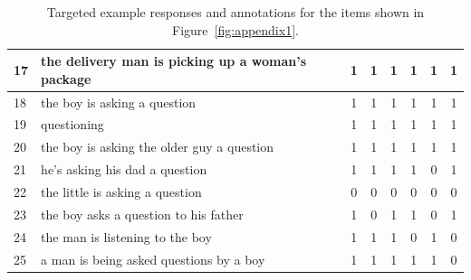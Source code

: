 \documentclass[12pt,notitlepage]{article}
\begin{document}
\begin{table}[h]
\begin{center}
\begin{tabular}{|l|p{11cm}|c|c|c|c|c|c|}
\hline
17 & the delivery man is picking up a woman's package & 1 & 1 & 1 & 1 & 1 & 1 \\
\hline
\hline
18 & the boy is asking a question & 1 & 1 & 1 & 1 & 1 & 1 \\
\hline
19 & questioning & 1 & 1 & 1 & 1 & 1 & 1 \\
\hline
20 & the boy is asking the older guy a question & 1 & 1 & 1 & 1 & 1 & 1 \\
\hline
21 & he's asking his dad a question & 1 & 1 & 1 & 1 & 0 & 1 \\
\hline
22 & the little is asking a question & 0 & 0 & 0 & 0 & 0 & 0 \\
\hline
23 & the boy asks a question to his father & 1 & 0 & 1 & 1 & 0 & 1 \\
\hline
24 & the man is listening to the boy & 1 & 1 & 1 & 0 & 1 & 0 \\
\hline
25 & a man is being asked questions by a boy & 1 & 1 & 1 & 1 & 1 & 0 \\
\hline
\end{tabular}
\end{center}
\caption{Targeted example responses and annotations for the items shown in Figure~\ref{fig:appendix1}.}
\label{tab:targeted}
\end{table}
\end{document}
